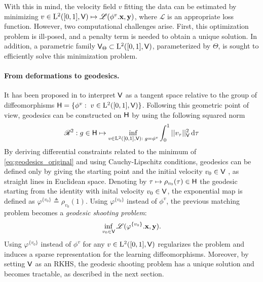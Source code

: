 With this in mind, the velocity field $v$ fitting the data can be
estimated by minimizing 
$v \in \mathrm{L}^2([0,1],\mathsf{V}) \mapsto \mathscr{L}(\phi^{v}.\mathbf{x},\mathbf{y})$, where $\mathscr{L}$ is an appropriate loss function.
 However, two computational challenges arise.
  First, this optimization problem is ill-posed, and a penalty term is needed to obtain a unique solution.
   In addition, a parametric family $\mathsf{V}_{\Theta} \subset \mathrm{L}^2([0,1],\mathsf{V})$, parameterized by $\Theta$, is sought to efficiently solve this minimization problem. 
\paragraph*{From deformations to geodesics.}
It has been proposed in \cite{miller2006geodesic} to interpret $\mathsf{V}$ as a tangent space relative to the group of diffeomorphisms $\mathsf{H}=\{ \phi^v:\; v\in \mathrm{L}^2([0,1],\mathsf{V})\}$.
Following this geometric point of view, geodesics can be constructed on $\mathsf{H}$ by using the following squared norm 
 \begin{equation}
  \label{eq:geodesics_original}
    \mathscr{R}^2: g\in \mathsf{H}\mapsto \inf_{ v\in \mathrm{L}^2([0,1],\mathsf{V}):\; g=\phi^v} \int_0^1 || v_\tau||_{\mathsf{V}}^2\mathop{}\!\mathrm{d} \tau
 \end{equation}
By deriving differential constraints related to the minimum of \eqref{eq:geodesics_original} and using Cauchy-Lipschitz conditions, geodesics can be defined only by giving the starting point and the initial velocity $v_0\in \mathsf{V}$ \cite{miller2006geodesic}, as straight lines in Euclidean space.
Denoting by $\tau \mapsto \rho_{v_0}(\tau)\in\mathsf{H}$ the geodesic starting from the identity with inital velocity $v_0\in \mathsf{V}$, the exponential map is defined as $\varphi^{\{v_0\}}\triangleq \rho_{v_0}(1)$. Using $\varphi^{\{v_0\}}$ instead of $\phi^v$, the previous matching problem becomes a \textit{geodesic shooting problem}:
 \begin{equation}
  \label{eq:geodesics_shooting}
  \inf_{v_0 \in \mathsf{V}} \mathscr{L}(\varphi^{\{v_0\}}.\mathbf{x},\mathbf{y}).
 \end{equation}
 Using $\varphi^{\{v_0\}}$ instead of $\phi^v$ for any $v\in \mathrm{L}^2([0,1],\mathsf{V})$ regularizes the problem and induces a sparse representation for the learning diffeomorphisms.
 Moreover, by setting $\mathsf{V}$ as an RKHS, the geodesic shooting problem has a unique solution and becomes tractable, as described in the next section.




